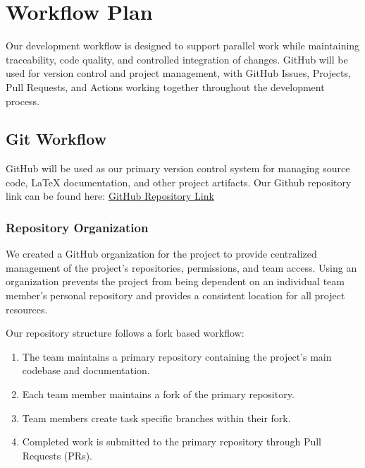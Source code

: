\documentclass{article}
\begin{document}
\section{Workflow Plan}

Our development workflow is designed to support parallel work while maintaining
traceability, code quality, and controlled integration of changes. GitHub will
be used for version control and project management, with GitHub Issues,
Projects, Pull Requests, and Actions working together throughout the
development process.



\subsection{Git Workflow}

GitHub will be used as our primary version control system for managing source
code, \LaTeX{} documentation, and other project artifacts. Our Github repository link 
can be found here: \href{https://github.com/team-hindsight/ophthamology-game}{GitHub Repository Link}


\subsubsection{Repository Organization}

We created a GitHub organization for the project to provide centralized
management of the project's repositories, permissions, and team access.
Using an organization prevents the project from being dependent on an
individual team member's personal repository and provides a consistent
location for all project resources.

Our repository structure follows a fork based workflow:

\begin{enumerate}
    \item The team maintains a primary repository containing the project's
    main codebase and documentation.

    \item Each team member maintains a fork of the primary repository.

    \item Team members create task specific branches within their fork.

    \item Completed work is submitted to the primary repository through
    Pull Requests (PRs).
\end{enumerate}
\end{document}
